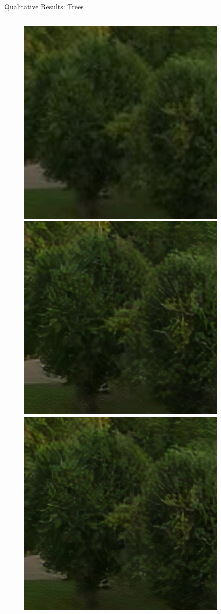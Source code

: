 \documentclass{beamer}
\begin{document}
\begin{frame}{Qualitative Results: Trees}
\begin{figure}
  \begin{columns}
      \includegraphics[width=0.6\linewidth]{static/trees_bilinear_interpolation.png}
      \includegraphics[width=0.6\linewidth]{static/trees_srunet.png}
      \includegraphics[width=0.6\linewidth]{static/trees_srunet_int8.png}
  \end{columns}

\end{figure}
\end{frame}
\end{document}
